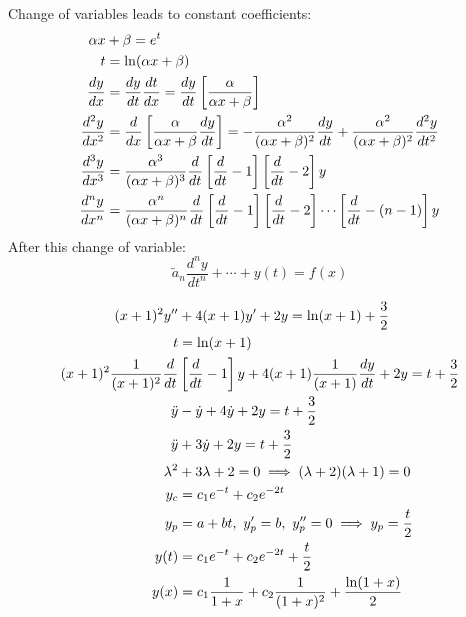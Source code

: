 \documentclass[Maths.tex]{subfiles}
\begin{document}
Change of variables leads to constant coefficients:
\begin{align*}
    \alpha x &+ \beta = e^t \\
    t &= \ln(\alpha x + \beta) \\
    \frac{dy}{dx} &= \frac{dy}{dt}\frac{dt}{dx} = \frac{dy}{dt}\left[\frac{\alpha}{\alpha x + \beta}\right] \\
    \frac{d^2 y}{dx^2} &= \frac{d}{dx}\left[\frac{\alpha}{\alpha x + \beta} \frac{dy}{dt}\right] = -\frac{\alpha^2}{(\alpha x + \beta)^2}\frac{dy}{dt} + \frac{\alpha^2}{(\alpha x + \beta)^2}\frac{d^2 y}{dt^2} \\
    \frac{d^3y}{dx^3} &= \frac{\alpha^3}{(\alpha x + \beta)^3}\frac{d}{dt}\left[\frac{d}{dt} - 1\right]\left[\frac{d}{dt} - 2\right]y \\
    \frac{d^ny}{dx^n} &= \frac{\alpha^n}{(\alpha x + \beta)^n}\frac{d}{dt}\left[\frac{d}{dt} - 1\right]\left[\frac{d}{dt} - 2\right]\cdots\left[\frac{d}{dt} - (n - 1)\right]y
\end{align*}
After this change of variable:
\begin{equation*}
    \tilde{a}_n \frac{d^ny}{dt^n} + \cdots + y(t) = f(x)
\end{equation*}

\begin{example}
\begin{align*}
    (x + 1)^2y'' &+ 4(x+1)y' + 2y = \ln(x+1) + \frac{3}{2} \\
    t &= \ln(x+1) \\
    (x+1)^2\frac{1}{(x+1)^2}\frac{d}{dt}&\left[\frac{d}{dt}-1\right]y + 4(x+1)\frac{1}{(x+1)}\frac{dy}{dt} + 2y = t + \frac{3}{2} \\
    \ddot{y} &- \dot{y} + 4\dot{y} + 2y = t + \frac{3}{2} \\
    \ddot{y} &+ 3\dot{y} + 2y = t + \frac{3}{2} \\
    \lambda^2 &+ 3\lambda + 2 = 0 \implies (\lambda + 2)(\lambda + 1) = 0 \\
    y_c &= c_1e^{-t} + c_2e^{-2t} \\
    y_p &= a + bt,~ y'_p = b, ~ y''_p = 0 \implies y_p = \frac{t}{2} \\
    y(t) &= c_1e^{-t} + c_2e^{-2t} + \frac{t}{2} \\
    y(x) &= c_1\frac{1}{1+x} + c_2\frac{1}{(1+x)^2} + \frac{\ln(1+x)}{2}
\end{align*}
\end{example}
\end{document}
